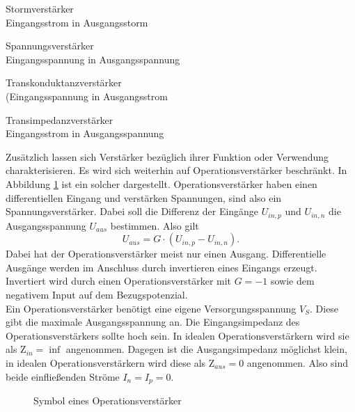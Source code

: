 \begin{description}
\item Stormverstärker \\
	  Eingangsstrom in Ausgangsstorm
\item Spannungsverstärker    		\\
	  Eingangsspannung in Ausgangsspannung
\item Transkonduktanzverstärker   \\
	  (Eingangsspannung  in Ausgangsstrom
\item Transimpedanzverstärker  	\\
Eingangsstrom  in Ausgangsspannung
\end{description}
Zusätzlich lassen sich Verstärker bezüglich ihrer Funktion oder Verwendung  charakterisieren. Es wird sich weiterhin auf Operationsverstärker beschränkt. In Abbildung \ref{fig:OpAmp} ist ein solcher dargestellt. Operationsverstärker haben einen differentiellen Eingang und verstärken Spannungen, sind also ein Spannungsverstärker. Dabei soll die Differenz der Eingänge $U_{in,p}$ und $U_{in,n}$ die Ausgangsspannung $U_{aus}$ bestimmen. Also gilt
\begin{equation}
U_{aus} = G \cdot \left( U_{in,p} - U_{in,n}\right).
\end{equation} Dabei hat der Operationsverstärker meist nur einen Ausgang. Differentielle Ausgänge werden im Anschluss durch invertieren eines Eingangs erzeugt. Invertiert wird durch einen Operationsverstärker mit $G = -1$ sowie dem negativem Input auf dem Bezugspotenzial.\\ 
Ein Operationsverstärker benötigt eine eigene Versorgungsspannung $V_{S}$. Diese gibt die maximale Ausgangsspannung an. Die Eingangsimpedanz des Operationsverstärkers sollte hoch sein. In idealen Operationsverstärkern wird sie als $\text{Z}_{in} = \inf$ angenommen. Dagegen ist die Ausgangsimpedanz möglichst klein, in idealen Operationsverstärkern wird diese als $\text{Z}_{aus} = 0$ angenommen. Also sind beide einfließenden Ströme $I_n = I_p = 0$.
\begin{figure}[tbp]
  \centering
  
  \caption{Symbol eines Operationsverstärker}
  \label{fig:OpAmp}
\end{figure}
